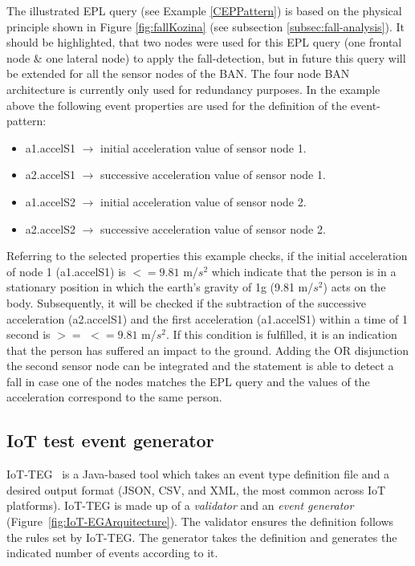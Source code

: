 \documentclass[review]{elsarticle}
\begin{document}
The illustrated EPL query (see Example \ref{CEPPattern}) is based on the physical principle shown in Figure \ref{fig:fallKozina} (see subsection \ref{subsec:fall-analysis}). It should be highlighted, that two nodes were used for this EPL query (one frontal node \& one lateral node) to apply the fall-detection, but in future this query will be extended for all the sensor nodes of the BAN. The four node BAN architecture is currently only used for redundancy purposes. In the example above the following event properties are used for the definition of the event-pattern:
\begin{itemize}
	\item a1.accelS1 $\rightarrow$ initial acceleration value of sensor node 1.
	\item a2.accelS1 $\rightarrow$ successive acceleration value of sensor node 1.
	\item a1.accelS2 $\rightarrow$ initial acceleration value of sensor node 2.
	\item a2.accelS2 $\rightarrow$ successive acceleration value of sensor node 2.
\end{itemize}
Referring to the selected properties this example checks, if the initial acceleration of node 1 (a1.accelS1) is $<= 9.81$ m/$s^2$ which indicate that the person is in a stationary position in which the earth's gravity of 1g (9.81 m/$s^2$) acts on the body. Subsequently, it will be checked if the subtraction of the successive acceleration (a2.accelS1) and the first acceleration (a1.accelS1)  within a time of 1 second is $>=$ $<= 9.81$ m/$s^2$. If this condition is fulfilled, it is an indication that the person has suffered an impact to the ground. Adding the OR disjunction the second sensor node can be integrated and the statement is able to detect a fall in case one of the nodes matches the EPL query and the values of the acceleration correspond to the same person.
\subsection{IoT test event generator}
\label{iotteg}

IoT-TEG~\cite{TesisGutierrez2017,Gutierrez2017} is a Java-based tool which takes an event 
type definition file and a desired output format (JSON, CSV, and XML, the most common across 
IoT platforms). IoT-TEG is made up of a \emph{validator} and an \emph{event generator} 
(Figure~\ref{fig:IoT-EGArquitecture}). The validator ensures the definition follows the rules set 
by IoT-TEG. The generator takes the definition and generates the indicated number of events according to it.
\end{document}
